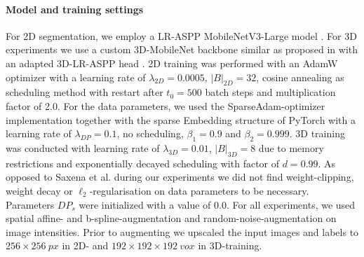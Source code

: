     \paragraph{\textbf{Model and training settings}}
    For 2D segmentation, we employ a LR-ASPP MobileNetV3-Large model \citep{howard2019searching}. For 3D experiments we use a custom 3D-MobileNet backbone similar as proposed in \citep{sandler2018mobilenetv2} with an adapted 3D-LR-ASPP head \citep{hempe2022opportunistic}.
    2D training was performed with an AdamW \citep{loshchilov2017decoupled} optimizer with a learning rate of \(\lambda_{2D}=0.0005\),
    \(\lvert B \rvert_{2D}=32\), cosine annealing \citep{loshchilov2016sgdr} as scheduling method with restart after \(t_0=500\) batch steps and multiplication factor of 2.0.
    For the data parameters, we used the SparseAdam-optimizer implementation together with the sparse Embedding structure of PyTorch with a learning rate of \(\lambda_{DP}=0.1\), no scheduling, \(\beta_1=0.9\) and \(\beta_2=0.999\).
    3D training was conducted with learning rate of \(\lambda_{3D}=0.01\), \(\lvert B \rvert_{3D}=8\) due to memory restrictions and exponentially decayed scheduling with factor of \(d=0.99\). As opposed to Saxena et al. \citep{saxena2019data} during our experiments we did not find weight-clipping, weight decay or \(\ell_{2}\)-regularisation on data parameters to be necessary. Parameters \(DP_s\) were initialized with a value of 0.0.
    For all experiments, we used spatial affine- and b-spline-augmentation and random-noise-augmentation on image intensities.
    Prior to augmenting we upscaled the input images and labels to \(256\times256~px\) in 2D- and \(192\times192\times192~vox\) in 3D-training.
